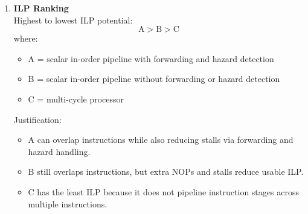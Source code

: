 \documentclass[11pt]{article}
\begin{document}
\begin{enumerate}[label=\textbf{C\arabic*.}]
  \item \textbf{ILP Ranking}
  \\[0.5ex]
  Highest to lowest ILP potential:
  \[
    \text{A} > \text{B} > \text{C}
  \]
  where:
  \begin{itemize}[leftmargin=1.5em]
    \item A = scalar in-order pipeline with forwarding and hazard detection
    \item B = scalar in-order pipeline without forwarding or hazard detection
    \item C = multi-cycle processor
  \end{itemize}
  Justification:
  \begin{itemize}[leftmargin=1.5em]
    \item A can overlap instructions while also reducing stalls via forwarding and hazard handling.
    \item B still overlaps instructions, but extra NOPs and stalls reduce usable ILP.
    \item C has the least ILP because it does not pipeline instruction stages across multiple instructions.
  \end{itemize}
\end{enumerate}
\end{document}
